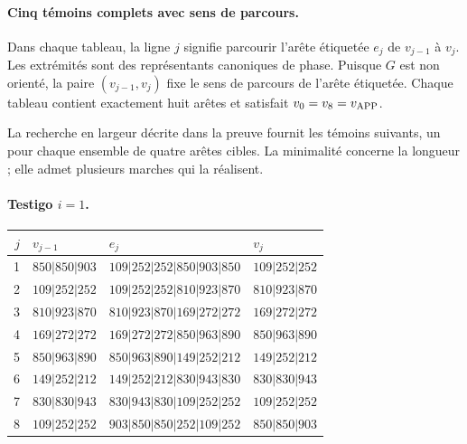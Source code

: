 \paragraph{Cinq témoins complets avec sens de parcours.}
Dans chaque tableau, la ligne \(j\) signifie parcourir l'arête étiquetée \(e_j\) de \(v_{j-1}\) à \(v_j\). Les extrémités sont des représentants canoniques de phase. Puisque \(G\) est non orienté, la paire \((v_{j-1},v_j)\) fixe le sens de parcours de l'arête étiquetée. Chaque tableau contient exactement huit arêtes et satisfait \(v_0=v_8=v_{\rm APP}\).

La recherche en largeur décrite dans la preuve fournit les
témoins suivants, un pour chaque ensemble de quatre arêtes cibles. La
minimalité concerne la longueur ; elle admet plusieurs marches qui la réalisent.
\paragraph{Testigo \(i=1\).}
\begin{center}
\small
\begin{tabular}{rlll}
\hline
\(j\)&\(v_{j-1}\)&\(e_j\)&\(v_j\)\\
\hline
1&\(850|850|903\)&\(109|252|252|850|903|850\)&\(109|252|252\)\\
2&\(109|252|252\)&\(109|252|252|810|923|870\)&\(810|923|870\)\\
3&\(810|923|870\)&\(810|923|870|169|272|272\)&\(169|272|272\)\\
4&\(169|272|272\)&\(169|272|272|850|963|890\)&\(850|963|890\)\\
5&\(850|963|890\)&\(850|963|890|149|252|212\)&\(149|252|212\)\\
6&\(149|252|212\)&\(149|252|212|830|943|830\)&\(830|830|943\)\\
7&\(830|830|943\)&\(830|943|830|109|252|252\)&\(109|252|252\)\\
8&\(109|252|252\)&\(903|850|850|252|109|252\)&\(850|850|903\)\\
\hline
\end{tabular}
\end{center}

